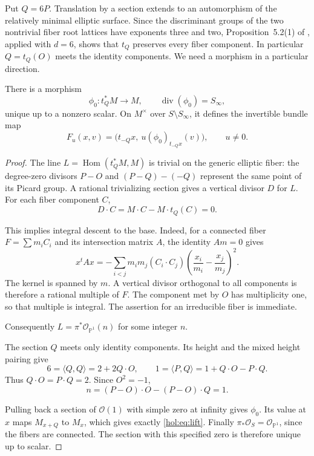 \documentclass[11pt]{article}
\numberwithin{equation}{section}
\begin{document}
Put $Q=6P$. Translation by a section extends to an automorphism of
the relatively minimal elliptic surface. Since the discriminant groups
of the two nontrivial fiber root lattices have exponents three and two, Proposition~5.2(1)
of \cite{DolgachevMartin}, applied with $d=6$, shows that $t_Q$
preserves every fiber component. In particular $Q=t_Q(O)$ meets
the identity components.
We need a morphism in a particular direction.

\begin{proposition}\label{hol:prop:lift}
There is a morphism
\[
 \phi_0:t_Q^*M\longrightarrow M,
 \qquad \operatorname{div}(\phi_0)=S_\infty,
\]
unique up to a nonzero scalar. On $M^\times$ over
$S\setminus S_\infty$, it defines the invertible bundle map
\begin{equation}\label{hol:eq:lift}
 F_u(x,v)=\bigl(t_{-Q}x,\ u(\phi_0)_{t_{-Q}x}(v)\bigr),
 \qquad u\ne0.
\end{equation}
\end{proposition}

\begin{proof}
The line $L=\operatorname{Hom}(t_Q^*M,M)$ is trivial on the generic
elliptic fiber: the degree-zero divisors $P-O$ and
$(P-Q)-(-Q)$ represent the same point of its Picard group.
A rational trivializing section gives a vertical divisor $D$ for
$L$. For each fiber component $C$,
\[
 D\cdot C=M\cdot C-M\cdot t_Q(C)=0.
\]

This implies integral descent to the base. Indeed, for a connected
fiber $F=\sum m_iC_i$ and its intersection matrix $A$, the identity
$Am=0$ gives
\[
 x^tAx=-\sum_{i<j}m_im_j(C_i\cdot C_j)
       \left(\frac{x_i}{m_i}-\frac{x_j}{m_j}\right)^2.
\]
The kernel is spanned by $m$. A vertical divisor orthogonal to all
components is therefore a rational multiple of $F$. The component
met by $O$ has multiplicity one, so that multiple is integral.
The assertion for an irreducible fiber is immediate.

Consequently
$L=\pi^*\mathcal O_{\mathbb P^1}(n)$ for some integer $n$.

The section $Q$ meets only identity components. Its height and the
mixed height pairing give
\[
 6=\langle Q,Q\rangle=2+2Q\cdot O,
 \qquad
 1=\langle P,Q\rangle=1+Q\cdot O-P\cdot Q.
\]
Thus $Q\cdot O=P\cdot Q=2$. Since $O^2=-1$,
\[
 n=(P-O)\cdot O-(P-O)\cdot Q=1.
\]

Pulling back a section of $\mathcal O(1)$ with simple zero at
infinity gives $\phi_0$. Its value at $x$ maps $M_{x+Q}$ to $M_x$,
which gives exactly \eqref{hol:eq:lift}.
Finally $\pi_*\mathcal O_S=\mathcal O_{\mathbb P^1}$, since the
fibers are connected. The section with this specified zero is
therefore unique up to scalar.
\end{proof}
\end{document}
